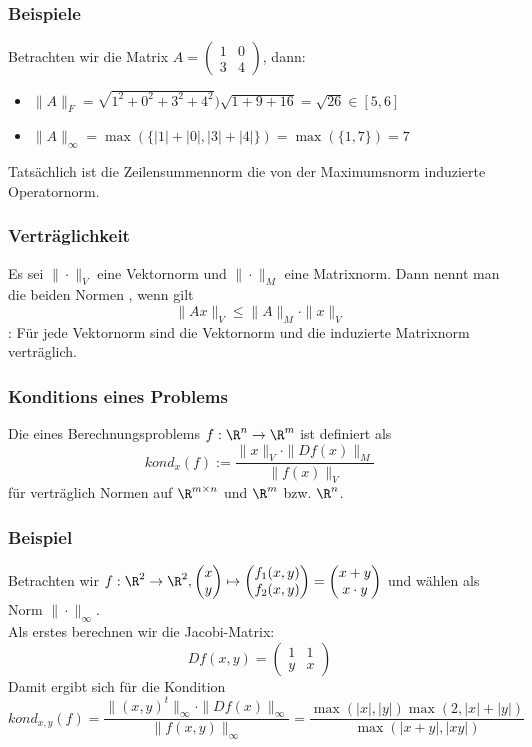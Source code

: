 %
%
\begin{frame}\frametitle{Beispiele}
Betrachten wir die Matrix $A=\begin{pmatrix} 1 & 0 \\ 3 & 4  \end{pmatrix}$, dann:\\
\vfill
\begin{itemize}
\item $\|A\|_F=\sqrt{1^2+0^2+3^2+4^2})\sqrt{1+9+16}=\sqrt{26} \in [5,6]$\pause\vfill
\item $\|A\|_\infty=\max(\{|1|+|0|,|3|+|4|\})=\max(\{1,7\})=7$\vfill
\end{itemize}
Tatsächlich ist die Zeilensummennorm die von der Maximumsnorm induzierte Operatornorm.
\end{frame}
%
%
\begin{frame}\frametitle{Verträglichkeit}
Es sei $\|\cdot\|_V$ eine Vektornorm und $\| \cdot\|_M$ eine Matrixnorm. Dann nennt man die beiden Normen , wenn gilt
$$
\|Ax\|_V \le \|A\|_M \cdot \|x\|_V
$$
\vfill
{}: Für jede Vektornorm sind die Vektornorm und die induzierte Matrixnorm verträglich.
\end{frame}
%
%
\begin{frame}\frametitle{Konditions eines Problems}
Die  eines Berechnungsproblems $f:\R^n \to \R^m$ ist definiert als
$$
kond_x(f):=\frac{\|x\|_V\cdot \|Df(x)\|_M}{\|f(x)\|_V} 
$$ \pause
für verträglich Normen auf $\R^{m\times n}$ und $\R^m$ bzw. $\R^n$.
\end{frame}
%
\begin{frame}\frametitle{Beispiel}
Betrachten wir $f: \R^2 \to \R^2, \begin{pmatrix}x\\y \end{pmatrix} \mapsto \begin{pmatrix}f_1(x,y)\\f_2(x,y) \end{pmatrix}= \begin{pmatrix} x+y\\x\cdot y \end{pmatrix}$ und wählen als Norm $\|\cdot \|_\infty$.\\ \vfill
Als erstes berechnen wir die Jacobi-Matrix:
$$
Df(x,y)=\begin{pmatrix}1 & 1 \\ y & x \end{pmatrix}
$$
Damit ergibt sich für die Kondition
$$
kond_{x,y}(f)=\frac{\|(x,y)^t\|_\infty \cdot \|Df(x)\|_\infty}{\|f(x,y)\|_\infty} = \frac{\max(|x|,|y|)\max(2,|x|+|y|)}{\max(|x+y|,|xy|)}
$$
\end{frame}
%
